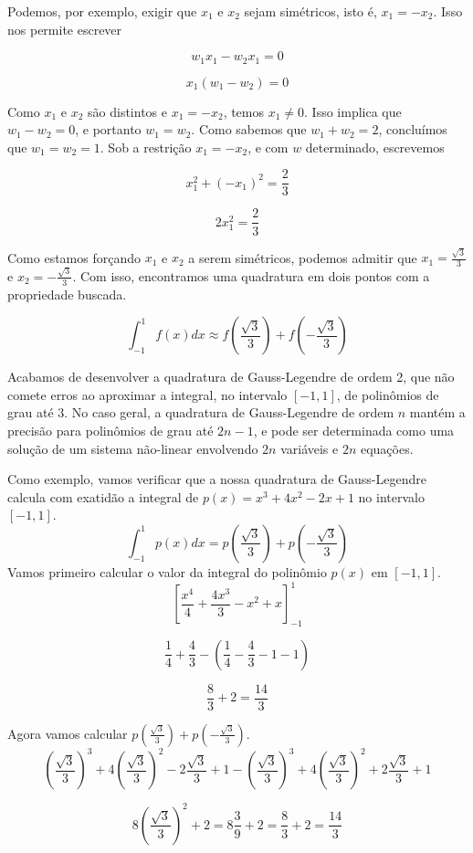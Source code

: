 \documentclass[]{article}
\numberwithin{equation}{section}
\begin{document}
Podemos, por exemplo, exigir que $x_1$ e $x_2$ sejam simétricos, isto
é, $x_1 = -x_2$. Isso nos permite escrever

$$
w_1x_1 - w_2x_1 = 0
$$

$$
x_1(w_1 - w_2) = 0
$$

Como $x_1$ e $x_2$ são distintos e $x_1 = - x_2$, temos $x_1 \neq
0$. Isso implica que $w_1 - w_2 = 0$, e portanto $w_1 = w_2$. Como
sabemos que $w_1 + w_2 = 2$, concluímos que $w_1 = w_2 = 1$. Sob a
restrição $x_1 = -x_2$, e com $w$ determinado, escrevemos

$$
x_1^2 + (-x_1)^2 = \frac{2}{3}
$$

$$
2x_1^2 = \frac{2}{3}
$$

Como estamos forçando $x_1$ e $x_2$ a serem simétricos, podemos
admitir que $x_1 = \frac{\sqrt{3}}{3}$ e $x_2 = -
\frac{\sqrt{3}}{3}$. Com isso, encontramos uma quadratura em dois
pontos com a propriedade buscada.

$$
\int_{-1}^{1} f(x) dx \approx f\left(\frac{\sqrt{3}}{3}\right) + f\left(- \frac{\sqrt{3}}{3}\right)
$$

Acabamos de desenvolver a quadratura de Gauss-Legendre de ordem 2, que
não comete erros ao aproximar a integral, no intervalo $[-1, 1]$, de
polinômios de grau até 3. No caso geral, a quadratura de
Gauss-Legendre de ordem $n$ mantém a precisão para polinômios de grau
até $2n - 1$, e pode ser determinada como uma solução de um sistema
não-linear envolvendo $2n$ variáveis e $2n$ equações.

Como exemplo, vamos verificar que a nossa quadratura de Gauss-Legendre
calcula com exatidão a integral de $p(x) = x^3 + 4x^2 - 2x + 1$ no
intervalo $[-1, 1]$.
$$
\int_{-1}^1 p(x) dx = p\left(\frac{\sqrt{3}}{3}\right) + p\left(-\frac{\sqrt{3}}{3}\right)
$$
Vamos primeiro calcular o valor da integral do polinômio $p(x)$ em
$[-1, 1]$.
$$
\left[\frac{x^4}{4} + \frac{4x^3}{3} - x^2 + x\right]_{-1}^1
$$

$$
\frac{1}{4} + \frac{4}{3} - \left(\frac{1}{4} - \frac{4}{3} - 1 - 1\right)
$$

$$
\frac{8}{3} + 2 = \frac{14}{3}
$$

Agora vamos calcular $p\left(\frac{\sqrt{3}}{3}\right) + p\left(-\frac{\sqrt{3}}{3}\right)$.
$$
\left(\frac{\sqrt{3}}{3}\right)^3 + 4\left(\frac{\sqrt{3}}{3}\right)^2 - 2\frac{\sqrt{3}}{3} + 1
- \left(\frac{\sqrt{3}}{3}\right)^3 + 4\left(\frac{\sqrt{3}}{3}\right)^2 + 2\frac{\sqrt{3}}{3} + 1
$$

$$
8\left(\frac{\sqrt{3}}{3}\right)^2 + 2 = 8\frac{3}{9} + 2 = \frac{8}{3} + 2 = \frac{14}{3}
$$
\end{document}
